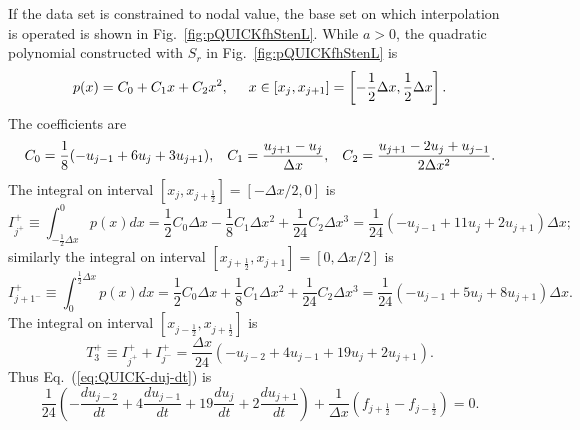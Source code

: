 \documentclass[]{article}
\def\jph{{j+\frac{1}{2}}}
\def\jmh{{j-\frac{1}{2}}}
\begin{document}
If the data set is constrained to nodal value, the base set on which
interpolation is operated is shown in Fig.~\ref{fig:pQUICKfhStenL}. While
$a>0$, the quadratic polynomial constructed with $S_r$ in
Fig.~\ref{fig:pQUICKfhStenL} is
\begin{equation*}
p(x) = C_0+C_1x+C_2x^2,\hspace{5mm} x\in [x_j,x_{j+1}]=\left[-\frac{1}{2}\Delta x,\frac{1}{2}\Delta x\right].
\end{equation*}
The coefficients are
\begin{equation*}
C_0=\frac{1}{8}(-u_{j-1}+6u_j+3u_{j+1}),\hspace{3mm}
C_1 = \frac{u_{j+1}-u_j}{\Delta x},\hspace{3mm}
C_2 = \frac{u_{j+1}-2u_j+u_{j-1}}{2\Delta x^2}.
\end{equation*}
The integral on interval $[x_j,x_{\jph}]=[-\Delta x/2,0]$ is
\begin{equation*}
I^+_{j^+}\equiv\int_{-\frac{1}{2}\Delta x}^0 p(x)dx = \frac{1}{2}C_0\Delta x-\frac{1}{8}C_1\Delta x^2+\frac{1}{24}C_2\Delta x^3
=\frac{1}{24}(-u_{j-1}+11u_j+2u_{j+1})\Delta x;
\end{equation*}
similarly the integral on interval $[x_{\jph},x_{j+1}]=[0,\Delta x/2]$ is
\begin{equation*}
I^+_{j+1^-}\equiv\int_0^{\frac{1}{2}\Delta x} p(x)dx = \frac{1}{2}C_0\Delta x+\frac{1}{8}C_1\Delta x^2+\frac{1}{24}C_2\Delta x^3
=\frac{1}{24}(-u_{j-1}+5u_j+8u_{j+1})\Delta x.
\end{equation*}
The integral on interval $[x_{\jmh},x_{\jph}]$ is
\begin{equation*}
T_3^+\equiv I^+_{j^+}+I^+_{j^-} = \frac{\Delta x}{24}(-u_{j-2}+4u_{j-1}+19u_j+2u_{j+1}).
\end{equation*}
Thus Eq.~(\ref{eq:QUICK-duj-dt}) is 
\begin{equation}
\frac{1}{24}\left(-\frac{d u_{j-2}}{dt}+4\frac{du_{j-1}}{dt}+19\frac{du_j}{dt}+2\frac{du_{j+1}}{dt}\right)
+\frac{1}{\Delta x}\left(f_{\jph}-f_{\jmh}\right)=0.
\label{eq:intx1}
\end{equation}
\end{document}
